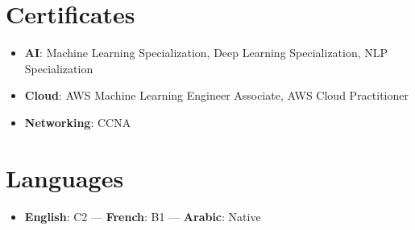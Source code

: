 \documentclass[letterpaper,11pt]{article}
\begin{document}
\section{Certificates}

\begin{itemize}[
  leftmargin=0.22in,
  label=\raisebox{0.25ex}{\tiny$\bullet$},
  itemsep=0pt,
  parsep=0pt,
  topsep=0pt
]

\item \small{
  \textbf{AI}:
  Machine Learning Specialization,
  Deep Learning Specialization,
  NLP Specialization
}

\item \small{
  \textbf{Cloud}:
  AWS Machine Learning Engineer Associate,
  AWS Cloud Practitioner
}

\item \small{
  \textbf{Networking}: CCNA
}

\end{itemize}

\section{Languages}

\begin{itemize}[
  leftmargin=0.22in,
  label=\raisebox{0.25ex}{\tiny$\bullet$},
  itemsep=0pt,
  parsep=0pt,
  topsep=0pt
]

\item \small{
  \textbf{English}: C2 ---
  \textbf{French}: B1 ---
  \textbf{Arabic}: Native
}

\end{itemize}

\end{document}
